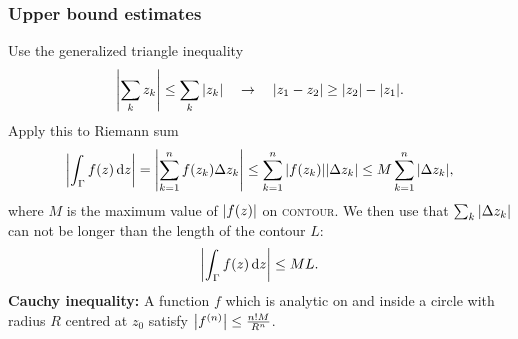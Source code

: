 \documentclass[a4paper, 10pt]{article}
\newcommand*\diff{\mathop{}\!\mathrm{d}}
\begin{document}
\begin{multicols*}{3}
\subsubsection*{\scriptsize Upper bound estimates}
Use the generalized triangle inequality
\begin{align*}
  \abs{\sum_k z_k } \leq \sum_k \abs{z_k}\quad \rightarrow \quad
  \abs{z_1-z_2} \geq \abs{z_2}-\abs{z_1}.
\end{align*}
Apply this to Riemann sum
\begin{align*}
  \abs{\int_\Gamma f(z) \diff z} = \abs{\sum_{k=1}^{n} f(z_k) \Delta z_k} \leq \sum_{k=1}^{n} \abs{f(z_k)} \abs{\Delta z_k} \leq M \sum_{k=1}^{n} \abs{\Delta z_k},
\end{align*}
where $M$ is the maximum value of $\abs{f(z)}$ on \textsc{contour}. We then use that $\sum_k \abs{\Delta z_k}$ can not be longer than the length of the contour $L$:
\begin{equation*}
  \abs{\int_\Gamma f(z) \diff z} \leq ML.
\end{equation*}
\textbf{Cauchy inequality:} A function $f$ which is analytic on and inside a circle with radius $R$ centred at $z_0$ satisfy $\abs{f^{(n)}} \leq \frac{n!M}{R^n}$.

\end{multicols*}
\end{document}
